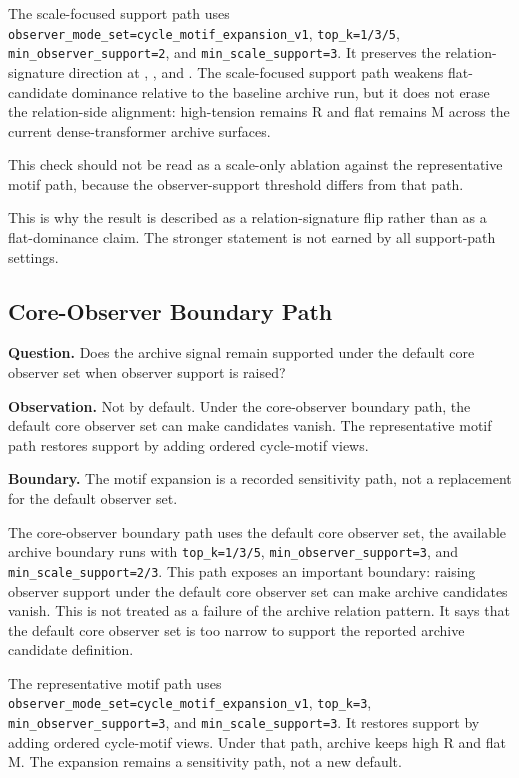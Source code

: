 \documentclass[11pt]{article}
\newcommand{\code}[1]{\texttt{\detokenize{#1}}}
\newcommand{\breakcode}[1]{\begingroup\urlstyle{tt}\nolinkurl{#1}\endgroup}
\begin{document}
The scale-focused support path uses
\breakcode{observer_mode_set=cycle_motif_expansion_v1}, \breakcode{top_k=1/3/5},
\breakcode{min_observer_support=2}, and \breakcode{min_scale_support=3}. It
preserves the relation-signature direction at \code{top_k=1}, \code{top_k=3},
and \code{top_k=5}. The scale-focused support path weakens flat-candidate
dominance relative to the baseline archive run, but it does not erase the
relation-side alignment: high-tension remains R and flat remains M across the
current dense-transformer archive surfaces.

This check should not be read as a scale-only ablation against the
representative motif path, because the observer-support threshold differs from
that path.

This is why the result is described as a relation-signature flip rather than
as a flat-dominance claim. The stronger statement is not earned by all
support-path settings.

\subsection{Core-Observer Boundary Path}

\textbf{Question.} Does the archive signal remain supported under the default
core observer set when observer support is raised?

\textbf{Observation.} Not by default. Under the core-observer boundary path,
the default core observer set can make candidates vanish. The representative
motif path restores support by adding ordered cycle-motif views.

\textbf{Boundary.} The motif expansion is a recorded sensitivity path, not a
replacement for the default observer set.

The core-observer boundary path uses the default core observer set, the
available archive boundary runs with \breakcode{top_k=1/3/5},
\breakcode{min_observer_support=3}, and \breakcode{min_scale_support=2/3}. This
path exposes an important boundary: raising observer support under the default
core observer set can make archive candidates vanish. This is not treated as a
failure of the archive relation pattern. It says that the default core observer
set is too narrow to support the reported archive candidate definition.

The representative motif path uses
\breakcode{observer_mode_set=cycle_motif_expansion_v1}, \breakcode{top_k=3},
\breakcode{min_observer_support=3}, and \breakcode{min_scale_support=3}. It
restores support by adding ordered cycle-motif views. Under that path, archive
keeps high R and flat M. The expansion remains a sensitivity path, not a new
default.
\end{document}
